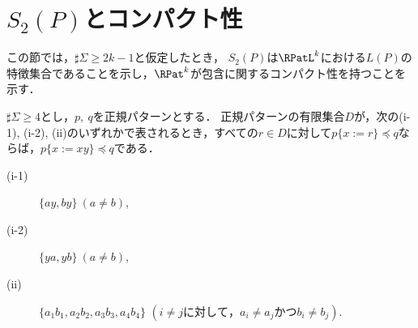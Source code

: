 \section{$S_{2}(P)$とコンパクト性}

この節では，$\sharp\Sigma \ge 2k-1$と仮定したとき，
$S_{2}(P)$は$\RPatL^{k}$における$L(P)$の特徴集合であることを示し，$\RPat^{k}$が包含に関するコンパクト性を持つことを示す．

\begin{lem}\label{補題14}
$\sharp \Sigma \ge 4$とし，$p,~q$を正規パターンとする．
正規パターンの有限集合$D$が，次の{\rm (i-1), (i-2), (ii)}のいずれかで表されるとき，すべての$r \in D$に対して$p \{ x := r \} \preceq q$ならば，$p \{ x := xy \} \preceq q$である．

\begin{description}
\item[{\rm (i-1)}] $\{ ay, by \} \ (a \ne b)$,
\item[{\rm (i-2)}] $\{ ya, yb \} \ (a \ne b)$,
\item[{\rm (ii)}] $\{ a_{1}b_{1}, a_{2}b_{2}, a_{3}b_{3}, a_{4}b_{4} \}$ $(i \ne j \mathrm{ に対して，} a_{i} \ne a_{j} \mathrm{ かつ} b_{i} \ne b_{j})$.
\end{description}
\end{lem}


